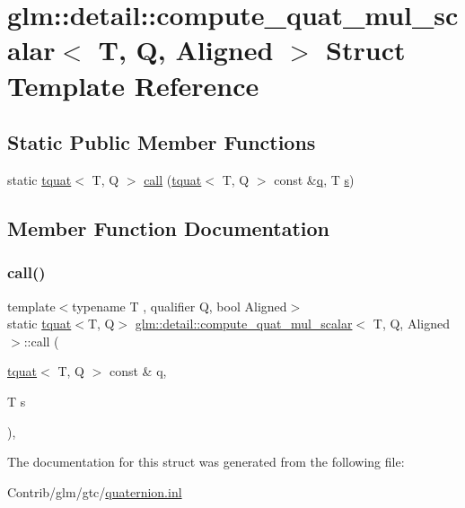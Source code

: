 \hypertarget{structglm_1_1detail_1_1compute__quat__mul__scalar}{}\section{glm\+:\+:detail\+:\+:compute\+\_\+quat\+\_\+mul\+\_\+scalar$<$ T, Q, Aligned $>$ Struct Template Reference}
\label{structglm_1_1detail_1_1compute__quat__mul__scalar}
\subsection*{Static Public Member Functions}
\begin{DoxyCompactItemize}
\item 
static \mbox{\hyperlink{structglm_1_1tquat}{tquat}}$<$ T, Q $>$ \mbox{\hyperlink{structglm_1_1detail_1_1compute__quat__mul__scalar_abc5cbc89b3e84f7a3dedca119fbded4d}{call}} (\mbox{\hyperlink{structglm_1_1tquat}{tquat}}$<$ T, Q $>$ const \&\mbox{\hyperlink{_s_d_l__opengl_8h_a8fc1e7b9baaae687804c7eed46ca09c6}{q}}, T \mbox{\hyperlink{_s_d_l__opengl_8h_a4af680a6c683f88ed67b76f207f2e6e4}{s}})
\end{DoxyCompactItemize}


\subsection{Member Function Documentation}
\mbox{\label{structglm_1_1detail_1_1compute__quat__mul__scalar_abc5cbc89b3e84f7a3dedca119fbded4d}} 
\subsubsection{\texorpdfstring{call()}{call()}}
{\footnotesize\ttfamily template$<$typename T , qualifier Q, bool Aligned$>$ \\
static \mbox{\hyperlink{structglm_1_1tquat}{tquat}}$<$T, Q$>$ \mbox{\hyperlink{structglm_1_1detail_1_1compute__quat__mul__scalar}{glm\+::detail\+::compute\+\_\+quat\+\_\+mul\+\_\+scalar}}$<$ T, Q, Aligned $>$\+::call (\begin{DoxyParamCaption}\item[{\mbox{\hyperlink{structglm_1_1tquat}{tquat}}$<$ T, Q $>$ const \&}]{q,  }\item[{T}]{s }\end{DoxyParamCaption})\hspace{0.3cm}{\ttfamily [inline]}, {\ttfamily [static]}}



The documentation for this struct was generated from the following file\+:\begin{DoxyCompactItemize}
\item 
Contrib/glm/gtc/\mbox{\hyperlink{gtc_2quaternion_8inl}{quaternion.\+inl}}\end{DoxyCompactItemize}
